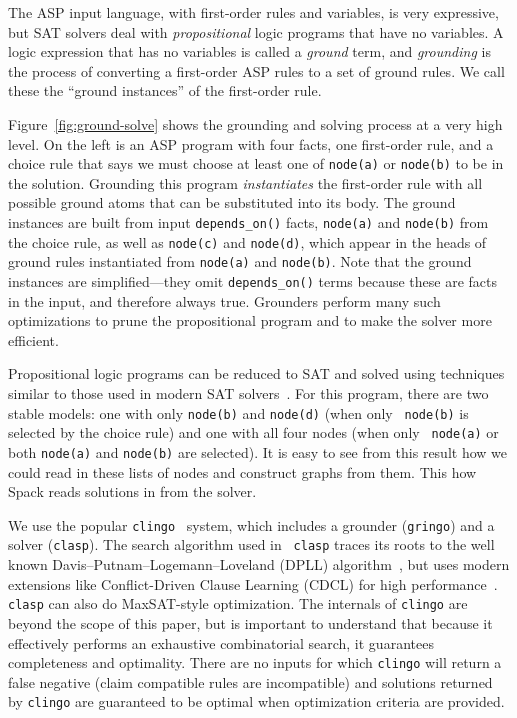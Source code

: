 The ASP input language, with first-order rules and variables, is very expressive, but
SAT solvers deal with {\it propositional} logic programs that have no variables. A logic
expression that has no variables is called a {\it ground} term, and {\it grounding} is
the process of converting a first-order ASP rules to a set of ground rules. We call
these the ``ground instances'' of the first-order rule.

Figure~\ref{fig:ground-solve} shows the grounding and solving process at a very high
level. On the left is an ASP program with four facts, one first-order rule, and a choice
rule that says we must choose at least one of {\tt node(a)} or {\tt node(b)} to be in
the solution. Grounding this program {\it instantiates} the first-order rule with all
possible ground atoms that can be substituted into its body. The ground instances are
built from input {\tt depends\_on()} facts, {\tt node(a)} and {\tt node(b)} from the
choice rule, as well as {\tt node(c)} and {\tt node(d)}, which appear in the heads of
ground rules instantiated from {\tt node(a)} and {\tt node(b)}. Note that the ground
instances are simplified---they omit {\tt depends\_on()} terms because these are facts
in the input, and therefore always true. Grounders perform many such optimizations to
prune the propositional program and to make the solver more efficient.

Propositional logic programs can be reduced to SAT and solved using techniques similar
to those used in modern SAT solvers~\cite{gebser+:asp-book}. For this program, there are
two stable models: one with only {\tt node(b)} and {\tt node(d)} (when only {\tt
  node(b)} is selected by the choice rule) and one with all four nodes (when only {\tt
  node(a)} or both {\tt node(a)} and {\tt node(b)} are selected). It is easy to see from
this result how we could read in these lists of nodes and construct graphs from them.
This how Spack reads solutions in from the solver.

We use the popular {\tt clingo}~\cite{gebser+:aicomm11} system, which includes a
grounder ({\tt gringo}) and a solver ({\tt clasp}). The search algorithm used in {\tt
  clasp} traces its roots to the well known Davis–Putnam–Logemann–Loveland (DPLL)
algorithm~\cite{dp-sat,dpll-sat}, but uses modern extensions like Conflict-Driven Clause
Learning (CDCL) for high performance~\cite{moskewicz2001chaff}. {\tt clasp} can also
do MaxSAT-style optimization.
%
The internals of {\tt clingo} are beyond the scope of this paper, but is important to
understand that because it effectively performs an exhaustive combinatorial search, it
guarantees completeness and optimality. There are no inputs for which {\tt clingo} will
return a false negative (claim compatible rules are incompatible) and solutions returned
by {\tt clingo} are guaranteed to be optimal when optimization criteria are provided.

